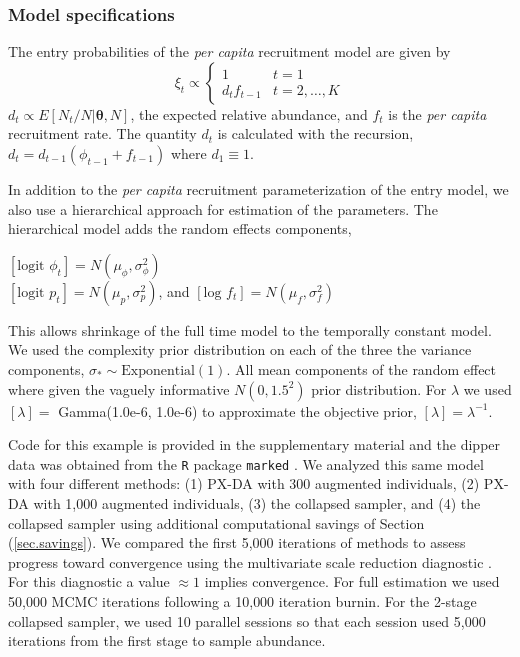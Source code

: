 \documentclass[11pt]{article}
\newcommand{\bt}{\ensuremath{\boldsymbol{\theta}}}
\begin{document}
\subsubsection{Model specifications}

The entry probabilities of the {\it per capita} recruitment model are given by 
\[
\xi_t \propto \left\{ \begin{array}{ll}
1  & t=1\\
d_t f_{t-1} & t=2,\dots,K
\end{array} \right.
\]
$d_t \propto E[N_t/N|\bt, N]$, the expected relative abundance, and $f_t$ is the {\it per capita} recruitment rate. The quantity $d_t$ is calculated with the recursion, $d_{t} = d_{t-1}(\phi_{t-1} + f_{t-1})$ where $d_1 \equiv 1$. 

In addition to the {\it per capita} recruitment parameterization of the entry model, we also use a hierarchical approach for estimation of the  parameters. The hierarchical model adds the random effects components,
\begin{center}
$[\text{logit } \phi_t] = N(\mu_\phi,\sigma_\phi^2)$ \\
$[\text{logit } p_t] = N(\mu_p,\sigma_p^2)$, and $[\text{log } f_t] = N(\mu_f,\sigma_f^2)$
\end{center}
This allows shrinkage of the full time model to the temporally constant model. We used the complexity prior distribution \citep{martins2017penalising} on each of the three the variance components, $\sigma_* \sim \text{Exponential}(1)$. All mean components of the random effect where given the vaguely informative $N(0,1.5^2)$ prior distribution. For $\lambda$ we used $[\lambda] =$ Gamma(1.0e-6, 1.0e-6) to approximate the objective prior, $[\lambda]=\lambda^{-1}$\citep{schofield2023estimating}.

Code for this example is provided in the supplementary material and the dipper data was obtained from the {\tt R} package {\tt marked} \citep{Laake:2013aa}. We analyzed this same model with four different methods: (1) PX-DA with 300 augmented individuals, (2) PX-DA with 1,000 augmented individuals, (3) the collapsed sampler, and (4) the collapsed sampler using additional computational savings of Section (\ref{sec.savings}). We compared the first 5,000 iterations of methods to assess progress toward convergence using the multivariate scale reduction diagnostic \citep{GelmanRubin1992a, BrooksGelman1998a}. For this diagnostic a value $\approx 1$ implies convergence. For full estimation we used 50,000 MCMC iterations following a 10,000 iteration burnin.  For the 2-stage collapsed sampler, we used 10 parallel sessions so that each session used 5,000 iterations from the first stage to sample abundance.
\end{document}

